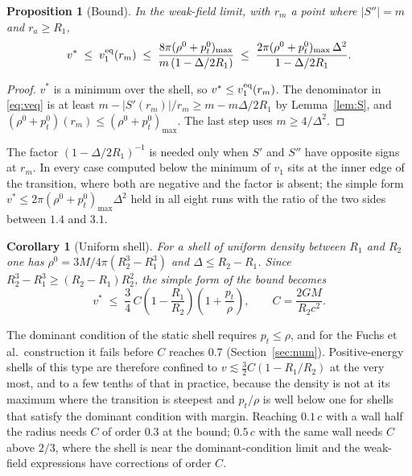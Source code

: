 \documentclass[11pt,a4paper]{article}
\newtheorem{proposition}{Proposition}
\newtheorem{corollary}{Corollary}
\theoremstyle{remark}
\begin{document}
\begin{proposition}[Bound]\label{prop:bound}
In the weak-field limit, with $r_m$ a point where $|S''| = m$ and $r_a \ge R_1$,
\begin{equation}
v^* \;\le\; v_1^{\rm eq}(r_m) \;\le\; \frac{8\pi(\rho^0 + p_t^0)_{\max}}{m\,(1 - \Delta/2R_1)} \;\le\; \frac{2\pi(\rho^0 + p_t^0)_{\max}\,\Delta^2}{1 - \Delta/2R_1}.
\label{eq:bound}
\end{equation}
\end{proposition}
\begin{proof}
$v^*$ is a minimum over the shell, so $v^* \le v_1^{\rm eq}(r_m)$. The denominator in \eqref{eq:veq} is at least $m - |S'(r_m)|/r_m \ge m - m\Delta/2R_1$ by Lemma~\ref{lem:S}, and $(\rho^0+p_t^0)(r_m) \le (\rho^0+p_t^0)_{\max}$. The last step uses $m \ge 4/\Delta^2$.
\end{proof}

The factor $(1-\Delta/2R_1)^{-1}$ is needed only when $S'$ and $S''$ have opposite signs at $r_m$. In every case computed below the minimum of $v_1$ sits at the inner edge of the transition, where both are negative and the factor is absent; the simple form $v^* \le 2\pi(\rho^0+p_t^0)_{\max}\Delta^2$ held in all eight runs with the ratio of the two sides between $1.4$ and $3.1$.

\begin{corollary}[Uniform shell]
For a shell of uniform density between $R_1$ and $R_2$ one has $\rho^0 = 3M/4\pi(R_2^3 - R_1^3)$ and $\Delta \le R_2 - R_1$. Since $R_2^3 - R_1^3 \ge (R_2 - R_1)R_2^2$, the simple form of the bound becomes
\begin{equation}
v^* \;\le\; \frac34\, C\left(1 - \frac{R_1}{R_2}\right)\left(1 + \frac{p_t}{\rho}\right), \qquad C = \frac{2GM}{R_2c^2}.
\label{eq:uniform}
\end{equation}
\end{corollary}

The dominant condition of the static shell requires $p_t \le \rho$, and for the Fuchs et al.\ construction it fails before $C$ reaches $0.7$ (Section~\ref{sec:num}). Positive-energy shells of this type are therefore confined to $v \lesssim \tfrac32 C(1 - R_1/R_2)$ at the very most, and to a few tenths of that in practice, because the density is not at its maximum where the transition is steepest and $p_t/\rho$ is well below one for shells that satisfy the dominant condition with margin. Reaching $0.1\,c$ with a wall half the radius needs $C$ of order $0.3$ at the bound; $0.5\,c$ with the same wall needs $C$ above $2/3$, where the shell is near the dominant-condition limit and the weak-field expressions have corrections of order $C$.
\end{document}
